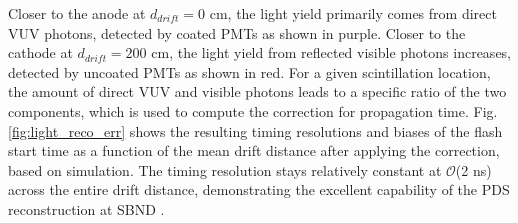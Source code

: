 Closer to the anode at $d_{drift} = 0 $ cm, the light yield primarily comes from direct VUV photons, detected by coated PMTs as shown in purple.
Closer to the cathode at $d_{drift} = 200 $ cm, the light yield from reflected visible photons increases, detected by uncoated PMTs as shown in red.
For a given scintillation location, the amount of direct VUV and visible photons leads to a specific ratio of the two components, which is used to compute the correction for propagation time.
Fig. \ref{fig:light_reco_err} shows the resulting timing resolutions and biases of the flash start time as a function of the mean drift distance after applying the correction, based on simulation.
The timing resolution stays relatively constant at $\mathcal{O}$(2 ns) across the entire drift distance, demonstrating the excellent capability of the PDS reconstruction at SBND \cite{sbnd_pds_paper}.

